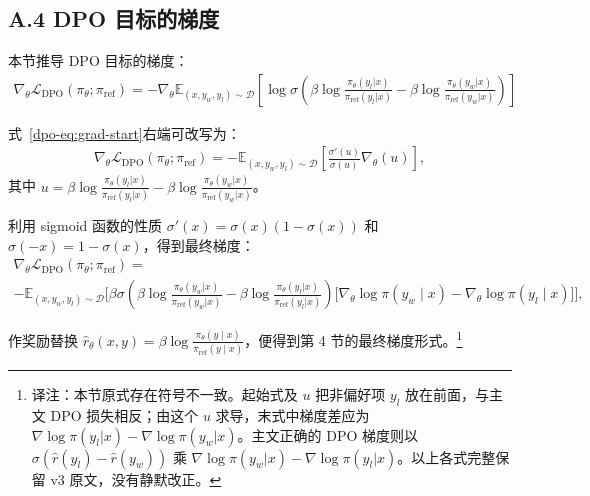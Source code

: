 \subsection*{A.4 DPO 目标的梯度}
本节推导 DPO 目标的梯度：
\begin{align}\label{dpo-eq:grad-start}
    \nabla_{\theta}\mathcal{L}_\text{DPO}(\pi_{\theta}; \pi_{\mathrm{ref}})
    = -\nabla_{\theta}\mathbb{E}_{(x, y_w, y_l)\sim \mathcal{D}}\left[\log \sigma \left(\beta \log \frac{\pi_{\theta}(y_l|x)}{\pi_{\mathrm{ref}}(y_l|x)} - \beta \log \frac{\pi_{\theta}(y_w|x)}{\pi_{\mathrm{ref}}(y_w|x)}\right)\right]
\end{align}

式~\ref{dpo-eq:grad-start}右端可改写为：
\begin{align}\label{dpo-display-25}
    \nabla_{\theta}\mathcal{L}_\text{DPO}(\pi_{\theta}; \pi_{\mathrm{ref}})
    =-\mathbb{E}_{(x, y_w, y_l)\sim \mathcal{D}}\left[\frac{\sigma'\left(u\right)}{\sigma \left(u\right)}\nabla_{\theta}\left(u\right)\right],
\end{align}
其中 $u=\beta\log\frac{\pi_\theta(y_l|x)}{\pi_{\mathrm{ref}}(y_l|x)}-\beta\log\frac{\pi_\theta(y_w|x)}{\pi_{\mathrm{ref}}(y_w|x)}$。

利用 sigmoid 函数的性质 $\sigma'(x)=\sigma(x)(1-\sigma(x))$ 和 $\sigma(-x)=1-\sigma(x)$，得到最终梯度：
\label{dpo-display-26}
\begin{multline*}
\nabla_{\theta}\mathcal{L}_\text{DPO}(\pi_{\theta}; \pi_{\mathrm{ref}}) = \\
     -\mathbb{E}_{(x, y_w, y_l) \sim \mathcal{D}} \bigg[\beta\sigma \left(\beta \log \frac{\pi_{\theta}(y_w|x)}{\pi_{\mathrm{ref}}(y_w|x)} - \beta \log \frac{\pi_{\theta}(y_l|x)}{\pi_{\mathrm{ref}}(y_l|x)}\right)\bigg[\nabla_\theta\log \pi(y_w \mid x) - \nabla_\theta\log\pi(y_l \mid x)\bigg]\bigg],
\end{multline*}

作奖励替换 $\hat r_\theta(x,y)=\beta\log\frac{\pi_\theta(y\mid x)}{\pi_{\mathrm{ref}}(y\mid x)}$，便得到第 4 节的最终梯度形式。\footnote{译注：本节原式存在符号不一致。起始式及 $u$ 把非偏好项 $y_l$ 放在前面，与主文 DPO 损失相反；由这个 $u$ 求导，末式中梯度差应为 $\nabla\log\pi(y_l|x)-\nabla\log\pi(y_w|x)$。主文正确的 DPO 梯度则以 $\sigma(\hat r(y_l)-\hat r(y_w))$ 乘 $\nabla\log\pi(y_w|x)-\nabla\log\pi(y_l|x)$。以上各式完整保留 v3 原文，没有静默改正。}


